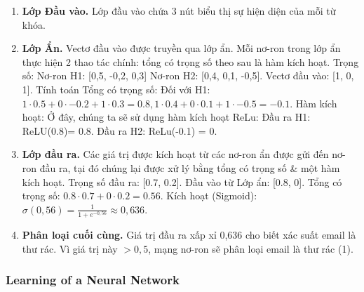 \documentclass{article}
\begin{document}
\begin{enumerate}
    \item {\bf Lớp Đầu vào.} Lớp đầu vào chứa 3 nút biểu thị sự hiện diện của mỗi từ khóa.
    \item {\bf Lớp Ẩn.} Vectơ đầu vào được truyền qua lớp ẩn. Mỗi nơ-ron trong lớp ẩn thực hiện 2 thao tác chính: tổng có trọng số theo sau là hàm kích hoạt. Trọng số: Nơ-ron H1: [0,5, -0,2, 0,3] Nơ-ron H2: [0,4, 0,1, -0,5]. Vectơ đầu vào: [1, 0, 1]. Tính toán Tổng có trọng số: Đối với H1: $1\cdot0.5 + 0\cdot-0.2 + 1\cdot0.3 = 0.8,1\cdot0.4 + 0\cdot0.1 + 1\cdot-0.5 = -0.1$. Hàm kích hoạt: Ở đây, chúng ta sẽ sử dụng hàm kích hoạt ReLu: Đầu ra H1: ReLU(0.8)= 0.8. Đầu ra H2: ReLu(-0.1) = 0.
    \item {\bf Lớp đầu ra.} Các giá trị được kích hoạt từ các nơ-ron ẩn được gửi đến nơ-ron đầu ra, tại đó chúng lại được xử lý bằng tổng có trọng số \& một hàm kích hoạt. Trọng số đầu ra: [0.7, 0.2]. Đầu vào từ Lớp ẩn: [0.8, 0]. Tổng có trọng số: $0.8\cdot0.7 + 0\cdot0.2 = 0.56$. Kích hoạt (Sigmoid): $\sigma(0,56) = \frac{1}{1 + e^{-0,56}}\approx0,636$.
    \item {\bf Phân loại cuối cùng.} Giá trị đầu ra xấp xỉ 0,636 cho biết xác suất email là thư rác. Vì giá trị này $> 0,5$, mạng nơ-ron sẽ phân loại email là thư rác (1).
\end{enumerate}


\subsubsection{Learning of a Neural Network}
\end{document}

